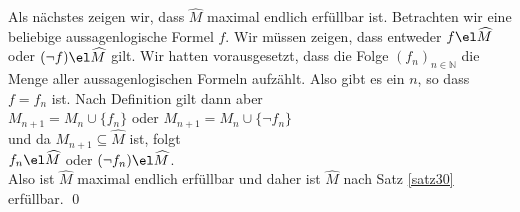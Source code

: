 \begin{enumerate}
  Als n\"{a}chstes zeigen wir, dass $\widehat{M}$ maximal endlich erf\"{u}llbar ist.  Betrachten wir eine
  beliebige aussagenlogische Formel $f$.  Wir m\"{u}ssen zeigen, dass entweder $f \el \widehat{M}$ oder 
  $(\neg f) \el \widehat{M}$ gilt.  Wir hatten vorausgesetzt, dass die Folge $(f_n)_{n \in \mathbb{N}}$ 
  die Menge aller aussagenlogischen Formeln aufz\"{a}hlt.  Also gibt es ein $n$, so dass $f = f_n$ ist.
  Nach Definition gilt dann aber 
  \\[0.2cm]
  \hspace*{1.3cm}
  $M_{n+1} = M_n \cup \{ f_n \}$ \quad oder \quad 
  $M_{n+1} = M_n \cup \{ \neg f_n \}$
  \\[0.2cm]
  und da $M_{n+1} \subseteq \widehat{M}$ ist, folgt
  \\[0.2cm]
  \hspace*{1.3cm}
  $f_n \el \widehat{M}$ \quad oder \quad
  $(\neg f_n) \el \widehat{M}$.
  \\[0.2cm]
  Also ist $\widehat{M}$ maximal endlich erf\"{u}llbar und daher ist $\widehat{M}$ nach Satz \ref{satz30} erf\"{u}llbar. \qed
\end{enumerate}

